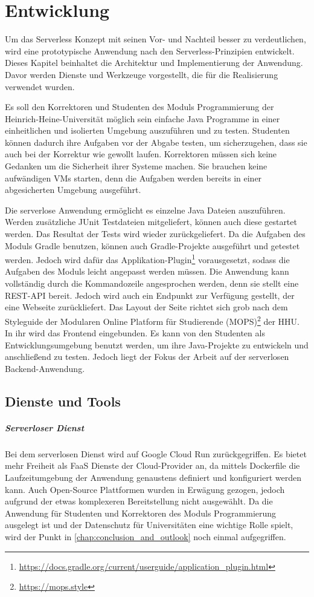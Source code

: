 \chapter{Entwicklung}
Um das Serverless Konzept mit seinen Vor- und Nachteil
besser zu verdeutlichen, wird eine prototypische Anwendung nach den Serverless-Prinzipien
entwickelt. Dieses Kapitel beinhaltet die Architektur und Implementierung
der Anwendung. Davor werden Dienste und Werkzeuge vorgestellt,
die für die Realisierung verwendet wurden.

Es soll den Korrektoren und Studenten des Moduls
Programmierung der Heinrich-Heine-Universität
möglich sein einfache Java Programme in einer einheitlichen und isolierten Umgebung
auszuführen und zu testen.
Studenten können dadurch ihre Aufgaben vor der Abgabe testen, um sicherzugehen,
dass sie auch bei der Korrektur wie gewollt laufen.
Korrektoren müssen sich keine Gedanken um die Sicherheit ihrer Systeme
machen. Sie brauchen keine aufwändigen VMs starten, denn die Aufgaben werden
bereits in einer abgesicherten Umgebung ausgeführt.

Die serverlose Anwendung ermöglicht es einzelne Java Dateien auszuführen.
Werden zusätzliche JUnit Testdateien mitgeliefert,
können auch diese gestartet werden. Das Resultat der Tests wird wieder
zurückgeliefert.
Da die Aufgaben des Moduls Gradle benutzen,
können auch Gradle-Projekte ausgeführt und getestet werden.
Jedoch wird dafür das Applikation-Plugin\footnote{\url{https://docs.gradle.org/current/userguide/application_plugin.html}}
vorausgesetzt, sodass die Aufgaben des Moduls leicht angepasst werden müssen.
Die Anwendung kann vollständig durch die Kommandozeile angesprochen werden, denn
sie stellt eine REST-API bereit.
Jedoch wird auch ein Endpunkt zur Verfügung gestellt, der eine Webseite zurückliefert.
Das Layout der Seite richtet sich grob nach dem Styleguide der
Modularen Online Platform für Studierende (MOPS)\footnote{\url{https://mops.style}}
der HHU. In ihr wird das Frontend eingebunden.
Es kann von den Studenten als Entwicklungsumgebung benutzt werden, um
ihre Java-Projekte zu entwickeln und anschließend zu testen.
Jedoch liegt der Fokus der Arbeit auf der serverlosen Backend-Anwendung.


\section{Dienste und Tools}
\paragraph{Serverloser Dienst} Bei dem serverlosen Dienst wird auf Google Cloud Run zurückgegriffen.
Es bietet mehr Freiheit als FaaS Dienste der Cloud-Provider an, da mittels Dockerfile die Laufzeitumgebung
der Anwendung genaustens definiert und konfiguriert werden kann. Auch Open-Source
Plattformen wurden in Erwägung gezogen, jedoch aufgrund der etwas komplexeren Bereitstellung nicht ausgewählt.
Da die Anwendung für Studenten und Korrektoren
des Moduls Programmierung ausgelegt ist und der Datenschutz für Universitäten eine wichtige Rolle
spielt, wird der Punkt in \autoref{chap:conclusion_and_outlook} noch einmal aufgegriffen.

